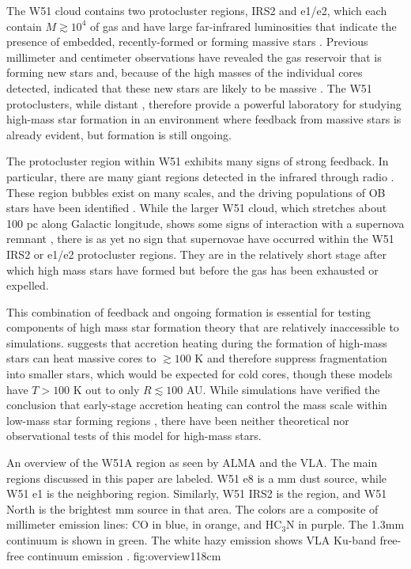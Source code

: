 \documentclass{emulateapj}
\begin{document}
The W51 cloud contains two protocluster regions, IRS2 and e1/e2, which each
contain $M\gtrsim10^4$ \msun of gas and have large far-infrared luminosities
that
indicate the presence of embedded, recently-formed or forming massive stars
\citep{Harvey1986a,Sievers1991a,Ginsburg2012a,Ginsburg2016b}.  Previous
millimeter and centimeter observations have revealed the gas reservoir
that is forming new stars and, because of the high masses of the individual
cores detected, indicated that these new stars are likely to be massive
\citep{Zhang1997a,Eisner2002a,Zapata2009a,Tang2009a,
Zapata2010a,Shi2010b,Shi2010a,Koch2010a,Koch2012a,Koch2012b,Tang2012a,Goddi2016a}.  The
W51 protoclusters, while distant \citep[5.4 kpc;][]{Sato2010a}, therefore
provide a powerful laboratory for studying high-mass star formation in an
environment where feedback from massive stars is already evident, but 
formation is still ongoing.

The protocluster region within W51 exhibits many signs of strong feedback.  In
particular, there are many giant \hii regions detected in the infrared through
radio \citep{Mehringer1994a,Ginsburg2015a}.  These \hii region bubbles exist
on many scales, and the driving populations of OB stars have been identified
\citep{Kumar2004a,Ginsburg2016a}.  While the larger W51 cloud, which stretches
about 100 pc along Galactic longitude, shows some signs of interaction with a
supernova remnant \citep{Brogan2013a,Ginsburg2015a}, there is as yet no
sign that supernovae have occurred within the W51 IRS2 or e1/e2 protocluster
regions.  They are in the relatively short stage after which high mass stars
have formed but before the gas has been exhausted or expelled.

This combination of feedback and ongoing formation is essential for testing
components of high mass star formation theory that are relatively inaccessible
to simulations.  \citet{Krumholz2006a} suggests that accretion heating during
the formation of high-mass stars can heat massive cores to $\gtrsim100$ K and
therefore suppress fragmentation into smaller stars, which would be expected
for cold cores, though these models have $T>100$ K out to only $R\lesssim100$
AU.  While simulations have verified the conclusion that early-stage accretion
heating can control the mass scale within low-mass star
forming regions \citep{Krumholz2007c,Offner2011b, Bate2012a,Bate2014b}, there
have been neither theoretical nor observational tests of this model for
high-mass stars. 

{An overview of the W51A region as seen by ALMA and the VLA.  The main regions
discussed in this paper are labeled.  W51 e8 is a mm dust source, while W51 e1
is the neighboring \hii region.  Similarly, W51 IRS2 is the \hii region, and
W51 North is the brightest mm source in that area.  The colors are a composite
of millimeter emission lines: CO in blue, \methanol in orange, and HC$_3$N in
purple.  The 1.3mm continuum is shown in green.  The white hazy emission
shows VLA Ku-band free-free continuum emission
\citep{Ginsburg2016b}.}
{fig:overview}{1}{18cm}
\end{document}
